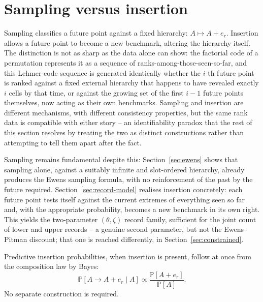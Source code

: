 \documentclass[11pt]{article}
\newcommand{\PP}{\mathbb{P}}
\theoremstyle{plain}
\theoremstyle{definition}
\begin{document}
\section{Sampling versus insertion}
\label{sec:insertion}

Sampling classifies a future point against a fixed hierarchy: \(A\mapsto A+e_r\). Insertion allows a future point to become a new benchmark, altering the hierarchy itself. The distinction is not as sharp as the data alone can show: the factorial code of a permutation represents it as a sequence of ranks-among-those-seen-so-far, and this Lehmer-code sequence is generated identically whether the \(i\)-th future point is ranked against a fixed external hierarchy that happens to have revealed exactly \(i\) cells by that time, or against the growing set of the first \(i-1\) future points themselves, now acting as their own benchmarks. Sampling and insertion are different mechanisms, with different consistency properties, but the same rank data is compatible with either story -- an identifiability paradox that the rest of this section resolves by treating the two as distinct constructions rather than attempting to tell them apart after the fact.

Sampling remains fundamental despite this: Section~\ref{sec:ewens} shows that sampling alone, against a suitably infinite and slot-ordered hierarchy, already produces the Ewens sampling formula, with no reinforcement of the past by the future required. Section~\ref{sec:record-model} realises insertion concretely: each future point tests itself against the current extremes of everything seen so far and, with the appropriate probability, becomes a new benchmark in its own right. This yields the two-parameter \((\theta,\zeta)\) record family, sufficient for the joint count of lower and upper records -- a genuine second parameter, but not the Ewens--Pitman discount; that one is reached differently, in Section~\ref{sec:constrained}.

Predictive insertion probabilities, when insertion is present, follow at once from the composition law by Bayes:
\[
\PP[A\to A+e_r\mid A]\propto\frac{\PP[A+e_r]}{\PP[A]}.
\]
No separate construction is required.
\end{document}
